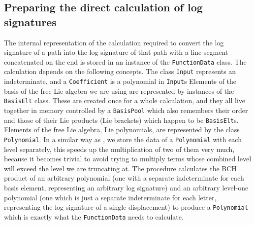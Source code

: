 \subsection{Preparing the direct calculation of log signatures}
The internal representation of the calculation required to convert the log signature of a path into the log signature of that path with a line segment concatenated on the end is stored in an instance of the \verb|FunctionData| class. The calculation depends on the following concepts. The class \verb|Input| represents an indeterminate, and a \verb|Coefficient| is a polynomial in \verb|Input|s %
Elements of the basis of the free Lie algebra we are using are represented by instances of the \verb|BasisElt| class. These are created once for a whole calculation, and they all live together in memory controlled by a \verb|BasisPool| which also remembers their order and those of their Lie products (Lie brackets) which happen to be \verb|BasisElt|s. Elements of the free Lie algebra, Lie polynomials, %
 are represented by the class \verb|Polynomial|. 
In a similar way as \cite{coropa}, we store the data of a \verb|Polynomial| with each level separately, this speeds up the multiplication of two of them very much, because it becomes trivial to avoid trying to multiply terms whose combined level will exceed the level we are truncating at. The procedure calculates the BCH product of an arbitrary polynomial (one with a separate indeterminate for each basis element, representing an arbitrary log signature) and an arbitrary level-one polynomial (one which is just a separate indeterminate for each letter, representing the log signature of a single displacement) to produce a \verb|Polynomial| which is exactly what the \verb|FunctionData| needs to calculate.

